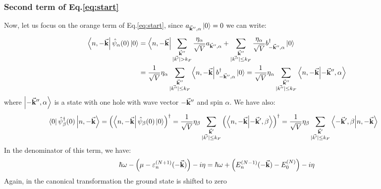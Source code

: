 \documentclass[11pt, a4paper, twoside, openright]{article}
\begin{document}
\subsubsection*{Second term of Eq.\eqref{eq:start}}
Now, let us focus on the orange term of Eq.\eqref{eq:start}, since \( a_{\va{k}'',\alpha } \ket{0} = 0 \) we can write:
\begin{equation*}
\begin{split}
  \bra{n, - \va{k}} \hat{\psi }_ \alpha  (0) \ket{0} &=
  \bra{n, - \va{k}} \sum_{\substack{\va{k}'' \\ | \vec{k'} | > k_F  } }^{}  \frac{\eta _ \alpha }{\sqrt{V} } a_{\va{k}'', \alpha}
  +
  \sum_{\substack{\va{k}'' \\ | \vec{k''} | \le k_F  } }^{}  \frac{\eta _\alpha }{\sqrt{V} } b_{-\va{k}'', \alpha } ^\dag \ket{0} \\
  &=
  \frac{1}{\sqrt{V} } \eta _ \alpha
  \sum_{\substack{\va{k}'' \\ | \vec{k''} | \le k_F  } }^{}   \bra{n,- \va{k}}
  b_{-\va{k}'', \alpha} ^\dag \ket{0}
 = \frac{1}{\sqrt{V} } \eta _ \alpha
 \sum_{\substack{\va{k}'' \\ | \vec{k''} | \le k_F  } }^{}   \braket{n, - \va{k}}{-\va{k}'', \alpha }
\end{split}
\end{equation*}
where \( \ket{-\va{k}'', \alpha  }  \) is a state with one hole with wave vector \( -\va{k}'' \) and spin \( \alpha   \).
We have also:
\begin{equation*}
\begin{split}
  \bra{0} \hat{\psi }_ \beta ^\dag
     (0) \ket{ n, - \va{k}} &=
    \qty( \bra{ n,- \va{k}} \hat{\psi }_ \beta
      (0) \ket{ 0 } ) ^\dag
     =   \frac{1}{\sqrt{V} } \eta _ \beta
     \sum_{\substack{\va{k}' \\ | \vec{k'} | \le k_F  } }^{} \qty(  \braket{n, - \va{k}}{ -\va{k}', \beta  } ) ^\dag
     = \frac{1}{\sqrt{V} } \eta _ \beta
     \sum_{\substack{\va{k}' \\ | \vec{k'} | \le k_F  } }^{}  \braket{-\va{k}', \beta  }{n,- \va{k}}
\end{split}
\end{equation*}
In the denominator of this term, we have:
\begin{equation*}
  \hbar \omega - \qty( \mu - \varepsilon _n^{(N+1)}(-\va{k})) - i \eta
  =   \hbar \omega  + \qty(  E_n^{(N-1)} (-\va{k}) - E_0^{(N)} ) - i \eta
\end{equation*}
Again, in the canonical transformation the ground state is shifted to zero
\end{document}
